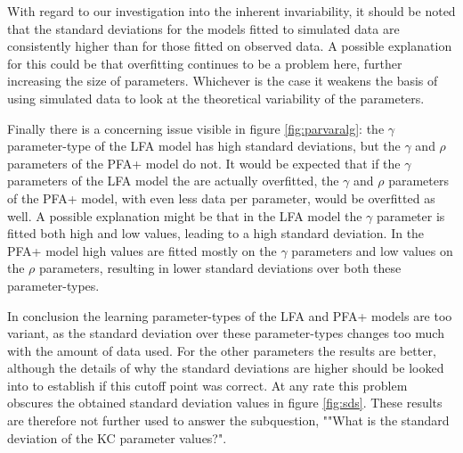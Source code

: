 \documentclass{scrartcl}
\begin{document}
With regard to our investigation into the inherent invariability, it should be noted that the standard deviations for the models fitted to simulated data are consistently higher than for those fitted on observed data. A possible explanation for this could be that overfitting continues to be a problem here, further increasing the size of parameters. Whichever is the case it weakens the basis of using simulated data to look at the theoretical variability of the parameters.

Finally there is a concerning issue visible in figure \ref{fig:parvaralg}: the $\gamma$ parameter-type of the LFA model has high standard deviations, but the $\gamma$ and $\rho$ parameters of the PFA+ model do not. It would be expected that if the $\gamma$ parameters of the LFA model the are actually overfitted, the $\gamma$ and $\rho$ parameters of the PFA+ model, with even less data per parameter, would be overfitted as well. A possible explanation might be that in the LFA model the $\gamma$ parameter is fitted both high and low values, leading to a high standard deviation. In the PFA+ model high values are fitted mostly on the $\gamma$ parameters and low values on the $\rho$ parameters, resulting in lower standard deviations over both these parameter-types.

In conclusion the learning parameter-types of the LFA and PFA+ models are too variant, as the standard deviation over these parameter-types changes too much with the amount of data used. For the other parameters the results are better, although the details of why the standard deviations are higher should be looked into to establish if this cutoff point was correct. At any rate this problem obscures the obtained standard deviation values in figure \ref{fig:sds}. These results are therefore not further used to answer the subquestion, ""What is the standard deviation of the KC parameter values?".
\end{document}
